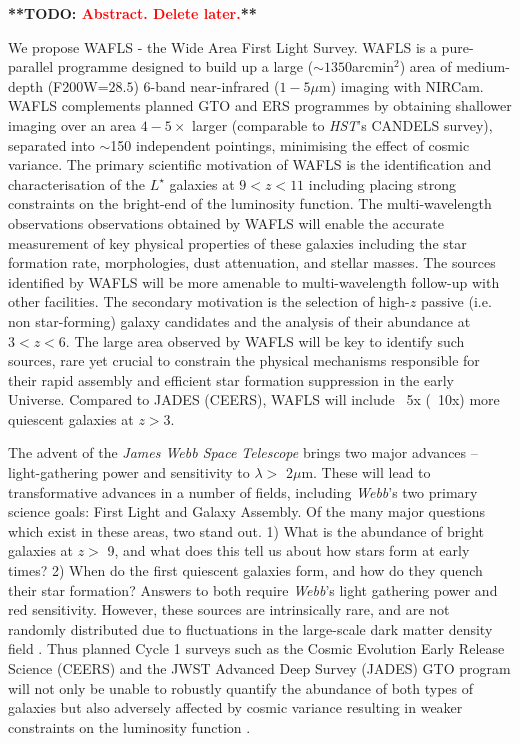 \documentclass[12pt]{article}
\newcommand{\todo}[1]{\textbf{**TODO: \textcolor{red}{#1}**}}
\begin{document}
%
%






\todo{Abstract. Delete later.}

We propose WAFLS - the Wide Area First Light Survey. WAFLS is a pure-parallel programme designed to build up a large ($\sim 1350$arcmin$^2$) area of medium-depth (F200W=$28.5$) 6-band near-infrared ($1-5\mu$m) imaging with NIRCam. WAFLS complements planned GTO and ERS programmes by obtaining shallower imaging over an area $4-5\times$ larger (comparable to {\it HST}'s CANDELS survey), separated into $\sim$150 independent pointings, minimising the effect of cosmic variance. The primary scientific motivation of WAFLS is the identification and characterisation of the $L^{\star}$ galaxies at $9<z<11$ including placing strong constraints on the bright-end of the luminosity function. The multi-wavelength observations observations obtained by WAFLS will enable the accurate measurement of key physical properties of these galaxies including the star formation rate, morphologies, dust attenuation, and stellar masses. The sources identified by WAFLS will be more amenable to multi-wavelength follow-up with other facilities. The secondary motivation is the selection of high-$z$ passive (i.e. non star-forming) galaxy candidates and the analysis of their abundance at $3<z<6$. The large area observed by WAFLS will be key to identify such sources, rare yet crucial to constrain the physical mechanisms responsible for their rapid assembly and efficient star formation suppression in the early Universe.  Compared to JADES (CEERS), WAFLS will include ~5x (~10x) more quiescent galaxies at $z>3$.  




\clearpage

\justification          %


The advent of the {\it James Webb Space Telescope} brings two major advances -- light-gathering power and sensitivity to $\lambda >$ 2$\mu$m.  These will lead to transformative advances in a number of fields, including \emph{Webb}'s two primary science goals: First Light and Galaxy Assembly.  Of the many major questions which exist in these areas, two stand out.  1) What is the abundance of bright galaxies at $z >$ 9, and what does this tell us about how stars form at early times?  2) When do the first quiescent galaxies form, and how do they quench their star formation?  Answers to both require {\it Webb}'s light gathering power and red sensitivity.  However, these sources are intrinsically rare, and are not randomly distributed due to fluctuations in the large-scale dark matter density field \citep[e.g.][]{2008ApJ...676..767T, 2020MNRAS.496..754B, 2020MNRAS.499.2401T}.  Thus planned Cycle 1 surveys such as the Cosmic Evolution Early Release Science (CEERS) and the JWST Advanced Deep Survey (JADES) GTO program will not only be unable to robustly quantify the abundance of both types of galaxies but also adversely affected by cosmic variance resulting in weaker constraints on the luminosity function \cite{2020MNRAS.499.2401T}.  
\end{document}
